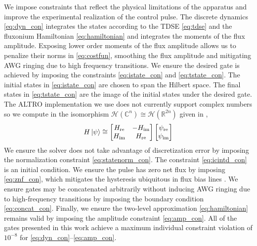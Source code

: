 We impose constraints that
reflect the physical limitations of the apparatus and 
improve the experimental realization of the control pulse.
The discrete dynamics \eqref{eq:dyn_con} integrates the states
according to the TDSE \eqref{eq:tdse} and the
fluxonium Hamiltonian \eqref{eq:hamiltonian}
and integrates the moments of the flux amplitude.
Exposing lower order moments of the flux amplitude allows us to penalize their norms
in \eqref{eq:costfun}, smoothing the flux amplitude
and mitigating AWG ringing due to high frequency transitions.
We ensure the desired gate is achieved by imposing the constraints
\eqref{eq:istate_con} and \eqref{eq:tstate_con}.
The initial states in \eqref{eq:istate_con}
are chosen to span the Hilbert space.
The final states in \eqref{eq:tstate_con} are the image
of the initial states under the desired gate.
The ALTRO implementation we use does not currently support complex numbers so
we compute in the isomorphism $\mathcal{H}(\mathbb{C}^{n}) \cong \mathcal{H}(\mathbb{R}^{2n})$
given in \cite{leung2017speedup},
\begin{equation}
  H \ket{\psi} \cong \begin{bmatrix} H_{\textrm{re}} & -H_{\textrm{im}}
    \\ H_{\textrm{im}} & H_{\textrm{re}}\end{bmatrix}
  \begin{bmatrix} \psi_{\textrm{re}} \\ \psi_{\textrm{im}}\end{bmatrix}
  \label{eq:isomorphism}
\end{equation}
We ensure the solver does not take advantage of discretization
error by imposing the normalization constraint \eqref{eq:statenorm_con}.
The constraint \eqref{eq:icintd_con} is an initial condition.
We ensure the pulse has zero net flux by imposing \eqref{eq:znf_con},
which mitigates the hysteresis ubiquitous in flux bias lines
\cite{battistel2019fast, krantz2019quantum, zhang2020universal}.
We ensure gates may be concatenated arbitrarily without
inducing AWG ringing due to high-frequency transitions by imposing
the boundary condition \eqref{eq:concat_con}.
Finally, we ensure the two-level
approximation \eqref{eq:hamiltonian} remains valid
by imposing the amplitude constraint \eqref{eq:amp_con}.
All of the gates presented in this work achieve a maximum
individual constraint violation of $10^{-8}$
for \eqref{eq:dyn_con}--\eqref{eq:amp_con}.

